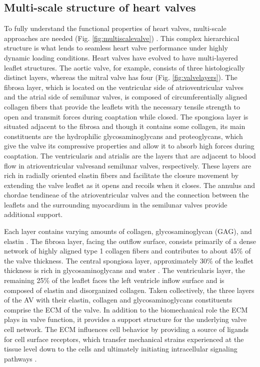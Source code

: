 \subsection{Multi-scale structure of heart valves}

    To fully understand the functional properties of heart valves, multi-scale approaches are needed (Fig. \ref{fig:multiscalevalve}) \cite{salma_heart_2016}. This complex hierarchical structure is what lends to seamless heart valve performance under highly dynamic loading conditions. Heart valves have evolved to have multi-layered leaflet structures. The aortic valve, for example, consists of three histologically distinct layers, whereas the mitral valve has four (Fig. \ref{fig:valvelayers}). The fibrosa layer, which is located on the ventricular side of atrioventricular valves and the atrial side of semilunar valves, is composed of circumferentially aligned collagen fibers that provide the leaflets with the necessary tensile strength to open and transmit forces during coaptation while closed. The spongiosa layer is situated adjacent to the fibrosa and though it contains some collagen, its main constituents are the hydrophilic glycosaminoglycans and proteoglycans, which give the valve its compressive properties and allow it to absorb high forces during coaptation. The ventricularis and atrialis are the layers that are adjacent to blood flow in atrioventricular valvesand semilunar valves, respectively. These layers are rich in radially oriented elastin fibers and facilitate the closure movement by extending the valve leaflet as it opens and recoils when it closes. The annulus and chordae tendineae of the atrioventricular valves and the connection between the leaflets and the surrounding myocardium in the semilunar valves provide additional support. 


    Each layer contains varying amounts of collagen, glycosaminoglycan (GAG), and elastin \cite{carruthers_gene_2012}. The fibrosa layer, facing the outflow surface, consists primarily of a dense network of highly aligned type 1 collagen fibers and contributes to about 45\% of the valve thickness. The central spongiosa layer, approximately 30\% of the leaflet thickness is rich in glycosaminoglycans and water \cite{carruthers_gene_2012}. The ventricularis layer, the remaining 25\% of the leaflet faces the left ventricle inflow surface and is composed of elastin and disorganized collagen. Taken collectively, the three layers of the AV with their elastin, collagen and glycosaminoglycans constituents comprise the ECM of the valve. In addition to the biomechanical role the ECM plays in valve function, it provides a support structure for the underlying valve cell network. The ECM influences cell behavior by providing a source of ligands for cell surface receptors, which transfer mechanical strains experienced at the tissue level down to the cells and ultimately initiating intracellular signaling pathways \cite{wiltz_extracellular_2013}.


